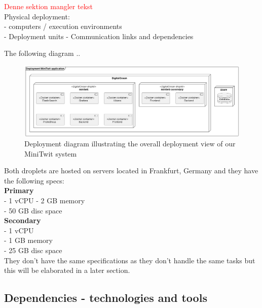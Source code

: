 \textcolor{red}{Denne sektion mangler tekst} \\
Physical deployment: \\
- computers / execution environments \\
- Deployment units
- Communication links and dependencies

The following diagram .. 
\begin{figure}[H]
 \centering
 \includegraphics[width = \textwidth]{Images/deployment.png}
 \caption{Deployment diagram illustrating the overall deployment view of our MiniTwit system}
 \label{fig:DeploymentDiagram}
\end{figure}

\noindent
Both droplets are hosted on servers located in Frankfurt, Germany and they have the following specs: \\
\textbf{Primary} \\
- 1 vCPU
- 2 GB memory \\
- 50 GB disc space \\

\noindent
\textbf{Secondary} \\
- 1 vCPU \\
- 1 GB memory \\
- 25 GB disc space \\

They don't have the same specifications as they don't handle the same tasks but this will be elaborated in a later section.


\newpage
\subsection{Dependencies - technologies and tools}

